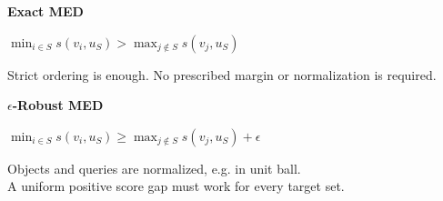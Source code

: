 \documentclass[final]{article}
\newcommand{\SubheadFont}{\fontsize{36}{42}\selectfont\bfseries}
\newcommand{\EquationFont}{\fontsize{36}{42}\selectfont}
\begin{document}
\begin{minipage}[t]{0.315\linewidth}
\begin{posterbox}
    \vspace{0.25in}
    \begin{posterbox}[defblock]
      {\SubheadFont Exact MED}\par\vspace{0.04in}
      {\centering\EquationFont
        $\displaystyle
        \min_{i\in S}s(v_i,u_S)>
        \max_{j\notin S}s(v_j,u_S)$\par}
      \vspace{0.04in}
      Strict ordering is enough. No prescribed margin or
      normalization is required.
    \end{posterbox}

    \vspace{0.25in}
    \begin{posterbox}[defblock]
      {\SubheadFont $\epsilon$-Robust MED}\par\vspace{0.04in}
      {\centering\EquationFont
        $\displaystyle
        \min_{i\in S}s(v_i,u_S)\ge
        \max_{j\notin S}s(v_j,u_S)+\epsilon$\par}
      \vspace{0.04in}
      Objects and queries are normalized, e.g. in unit ball. \\A uniform positive
      score gap must work for every target set.
    \end{posterbox}


\end{posterbox}
\end{minipage}
\end{document}
